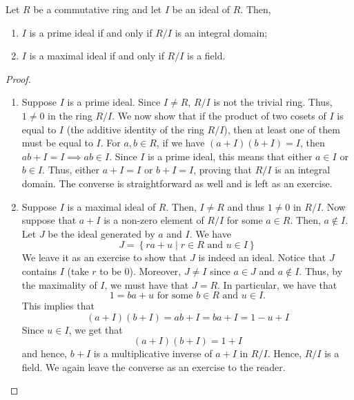 \begin{prop} \label{prop:ideal-characterisation-using-quotient-ring}
    Let $R$ be a commutative ring and let $I$ be an ideal of $R$. Then, 
    \begin{enumerate}
        \item $I$ is a prime ideal if and only if $R/I$ is an integral domain;
        \item $I$ is a maximal ideal if and only if $R/I$ is a field.
    \end{enumerate}
\end{prop}
\begin{proof} \phantom{hi}
\begin{enumerate}
    \item Suppose $I$ is a prime ideal. Since $I \neq R$, $R / I$ is not the trivial ring. Thus, $1 \neq 0$ in the ring $R/I$. We now show that if the product of two cosets of $I$ is equal to $I$ (the additive identity of the ring $R/I$), then at least one of them must be equal to $I$. For $a,b \in R$, if we have $(a+I)(b+I) = I$, then $ab + I = I \implies ab \in I$. Since $I$ is a prime ideal, this means that either $a \in I$ or $b \in I$. Thus, either $a + I = I$ or $b + I = I$, proving that $R/I$ is an integral domain. The converse is straightforward as well and is left as an exercise.
    
    \item Suppose $I$ is a maximal ideal of $R$. Then, $I \neq R$ and thus $1 \neq 0$ in $R/I$. Now suppose that $a+I$ is a non-zero element of $R/I$ for some $a \in R$. Then, $a \notin I$. Let $J$ be the ideal generated by $a$ and $I$. We have
    \[
        J = \left\{ ra + u \mid r \in R \text{ and } u \in I \right\}
    \]
    We leave it as an exercise to show that $J$ is indeed an ideal. Notice that $J$ contains $I$ (take $r$ to be $0$). Moreover, $J \neq I$ since $a \in J$ and $a \notin I$. Thus, by the maximality of $I$, we must have that $J = R$. In particular, we have that
    \[
        1 = ba + u \text{ for some } b \in R \text{ and } u \in I.
    \]
    This implies that
    \[
        (a + I)(b + I) = ab + I = ba + I = 1 - u + I
    \]
    Since $u \in I$, we get that
    \[
        (a + I)(b + I) = 1 + I
    \]
    and hence, $b + I$ is a multiplicative inverse of $a+I$ in $R/I$. Hence, $R/I$ is a field. We again leave the converse as an exercise to the reader. 
\end{enumerate}
    
\end{proof}

